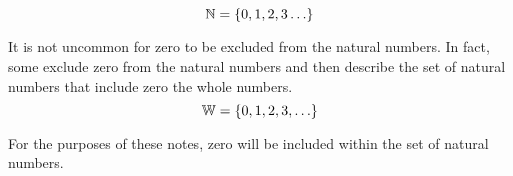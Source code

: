\begin{definition}

\[
\mathbb{N}=\left\{0, 1, 2, 3 \ldots\right\}
\]

\end{definition}

\begin{remark}
It is not uncommon for zero to be excluded from the natural numbers.  In fact, some exclude zero from the natural numbers and then describe the set of natural numbers that include zero the whole numbers. \\

\[
\mathbb{W}=\left\{0, 1, 2, 3, \ldots\right\}
\]

For the purposes of these notes, zero will be included within the set of natural numbers.
\end{remark}